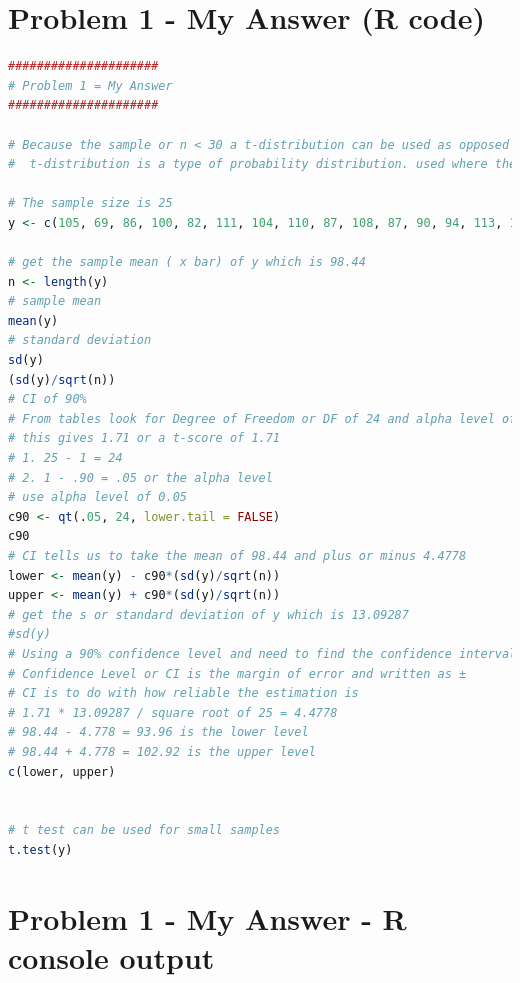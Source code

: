 \documentclass[12pt,letterpaper]{article}
\begin{document}
\section*{Problem 1 - My Answer (R code)}
	


\begin{lstlisting}[language=R]
#####################
# Problem 1 = My Answer
#####################

# Because the sample or n < 30 a t-distribution can be used as opposed to a normal distribution
#  t-distribution is a type of probability distribution. used where the sample size is small.

# The sample size is 25
y <- c(105, 69, 86, 100, 82, 111, 104, 110, 87, 108, 87, 90, 94, 113, 112, 98, 80, 97, 95, 111, 114, 89, 95, 126, 98)

# get the sample mean ( x bar) of y which is 98.44
n <- length(y) 
# sample mean
mean(y)
# standard deviation
sd(y)
(sd(y)/sqrt(n))
# CI of 90%
# From tables look for Degree of Freedom or DF of 24 and alpha level of 0.05
# this gives 1.71 or a t-score of 1.71
# 1. 25 - 1 = 24
# 2. 1 - .90 = .05 or the alpha level
# use alpha level of 0.05
c90 <- qt(.05, 24, lower.tail = FALSE)
c90
# CI tells us to take the mean of 98.44 and plus or minus 4.4778
lower <- mean(y) - c90*(sd(y)/sqrt(n))
upper <- mean(y) + c90*(sd(y)/sqrt(n))
# get the s or standard deviation of y which is 13.09287
#sd(y)
# Using a 90% confidence level and need to find the confidence interval
# Confidence Level or CI is the margin of error and written as ±
# CI is to do with how reliable the estimation is
# 1.71 * 13.09287 / square root of 25 = 4.4778
# 98.44 - 4.778 = 93.96 is the lower level
# 98.44 + 4.778 = 102.92 is the upper level
c(lower, upper)


# t test can be used for small samples
t.test(y)

\end{lstlisting}
	
\newpage

\section*{Problem 1 - My Answer  - R console output}
	
\end{document}
